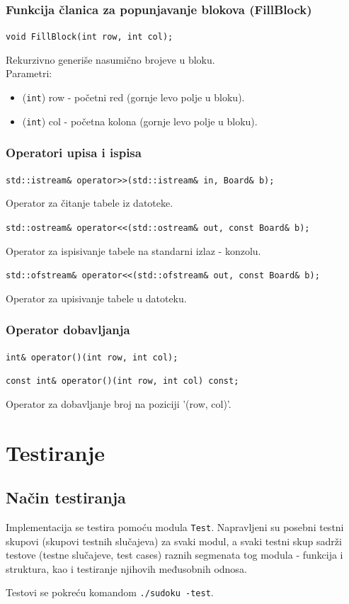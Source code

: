 \documentclass[a4paper]{article}
\begin{document}
    \subsubsection{Funkcija članica za popunjavanje blokova (FillBlock)}
    \texttt{void FillBlock(int row, int col);}
    \par Rekurzivno generiše nasumično brojeve u bloku.\\
    Parametri:
    \begin{itemize}
        \item (\texttt{int}) row - početni red (gornje levo polje u bloku).
        \item (\texttt{int}) col - početna kolona (gornje levo polje u bloku).
    \end{itemize}

    \subsubsection{Operatori upisa i ispisa}
    \par\texttt{std::istream\& operator>>(std::istream\& in, Board\& b);}
    \par Operator za čitanje tabele iz datoteke.
    \par\texttt{std::ostream\& operator<<(std::ostream\& out, const Board\& b);}
    \par Operator za ispisivanje tabele na standarni izlaz - konzolu.
    \par\texttt{std::ofstream\& operator<<(std::ofstream\& out, const Board\& b);}
    \par Operator za upisivanje tabele u datoteku. 

    \subsubsection{Operator dobavljanja}
    \par\texttt{int\& operator()(int row, int col);}
    \par\texttt{const int\& operator()(int row, int col) const;}
    \par Operator za dobavljanje broj na poziciji '(row, col)'.
    
    \newpage
    \section{Testiranje}
    \subsection{Način testiranja}
    Implementacija se testira pomoću modula \texttt{Test}. Napravljeni su posebni testni skupovi (skupovi testnih slučajeva) za svaki modul, 
    a svaki testni skup sadrži testove (testne slučajeve, test cases) raznih segmenata tog modula - funkcija i struktura, kao i testiranje njihovih međusobnih odnosa.
    \par Testovi se pokreću komandom \texttt{./sudoku -test}.
\end{document}
